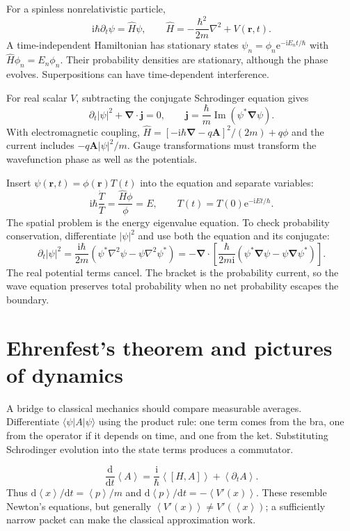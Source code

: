 \documentclass[11pt,oneside]{book}
\newcommand{\dd}{\mathrm{d}}
\newcommand{\ii}{\mathrm{i}}
\newcommand{\ee}{\mathrm{e}}
\newcommand{\vect}[1]{\boldsymbol{#1}}
\newcommand{\grad}{\boldsymbol{\nabla}}
\newcommand{\lap}{\nabla^2}
\newcommand{\avg}[1]{\left\langle #1\right\rangle}
\newcommand{\ket}[1]{\lvert #1\rangle}
\newcommand{\bra}[1]{\langle #1\rvert}
\newcommand{\od}[2]{\frac{\dd #1}{\dd #2}}
\theoremstyle{reviewstyle}
\begin{document}
For a spinless nonrelativistic particle,
\begin{equation}\ii\hbar\partial_t\psi=\hat H\psi,\qquad \hat H=-\frac{\hbar^2}{2m}\lap+V(\vect r,t).\end{equation}
A time-independent Hamiltonian has stationary states $\psi_n=\phi_n\ee^{-\ii E_nt/\hbar}$ with $\hat H\phi_n=E_n\phi_n$. Their probability densities are stationary, although the phase evolves. Superpositions can have time-dependent interference.

For real scalar $V$, subtracting the conjugate Schrodinger equation gives
\begin{equation}\partial_t|\psi|^2+\grad\cdot\vect j=0,\qquad \vect j=\frac\hbar m\operatorname{Im}(\psi^*\grad\psi).\end{equation}
With electromagnetic coupling, $\hat H=[-\ii\hbar\grad-q\vect A]^2/(2m)+q\phi$ and the current includes $-q\vect A|\psi|^2/m$. Gauge transformations must transform the wavefunction phase as well as the potentials.

Insert $\psi(\vect r,t)=\phi(\vect r)T(t)$ into the equation and separate variables:
\begin{equation}
\ii\hbar\frac{\dot T}{T}=\frac{\hat H\phi}{\phi}=E,
\qquad T(t)=T(0)\ee^{-\ii Et/\hbar}.
\end{equation}
The spatial problem is the energy eigenvalue equation. To check probability conservation, differentiate $|\psi|^2$ and use both the equation and its conjugate:
\begin{equation}
\partial_t|\psi|^2=
\frac{\ii\hbar}{2m}(\psi^*\lap\psi-\psi\lap\psi^*)
=-\grad\cdot\left[\frac{\hbar}{2m\ii}
(\psi^*\grad\psi-\psi\grad\psi^*)\right].
\end{equation}
The real potential terms cancel. The bracket is the probability current, so the wave equation preserves total probability when no net probability escapes the boundary.

\section{Ehrenfest's theorem and pictures of dynamics}
A bridge to classical mechanics should compare measurable averages. Differentiate $\bra\psi A\ket\psi$ using the product rule: one term comes from the bra, one from the operator if it depends on time, and one from the ket. Substituting Schrodinger evolution into the state terms produces a commutator.

\begin{equation}\od{}{t}\avg A=\frac{\ii}{\hbar}\avg{[H,A]}+\avg{\partial_t A}.\end{equation}
Thus $\dd\avg x/\dd t=\avg p/m$ and $\dd\avg p/\dd t=-\avg{V'(x)}$. These resemble Newton's equations, but generally $\avg{V'(x)}\neq V'(\avg x)$; a sufficiently narrow packet can make the classical approximation work.
\end{document}
